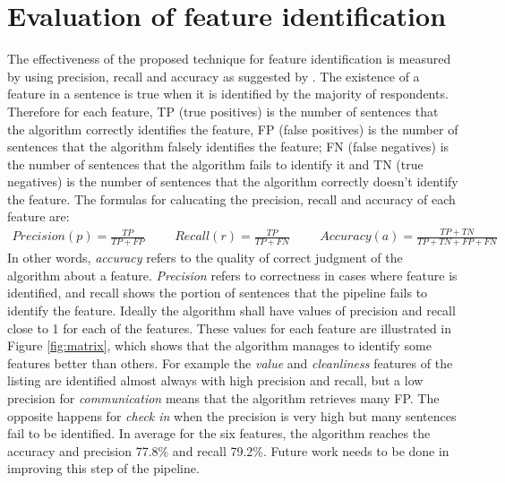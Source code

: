 \section{Evaluation of feature identification}
The effectiveness of the proposed technique for feature identification is measured by using precision, recall and accuracy as suggested by \cite{huang2006performance}.
The existence of a feature in a sentence is true when it is identified by the majority of respondents. Therefore for each feature, TP (true positives) is the number of sentences that the algorithm correctly identifies the feature, FP (false positives) is the number of sentences that the algorithm falsely identifies the feature; FN (false negatives) is the number of sentences that the algorithm fails to identify it and TN (true negatives) is the number of sentences that the algorithm correctly doesn't identify the feature. The formulas for calucating the precision, recall and accuracy of each feature are:
\begin{align}
Precision  (p) =\frac{TP}{TP+FP} \hspace{1cm}
Recall  (r) = \frac{TP}{TP + FN} \hspace{1cm}
Accuracy (a) = \frac{TP + TN}{TP+TN+FP+FN}
\end{align}
In other words, \textit{accuracy} refers to the quality of correct judgment of the algorithm about a feature.  \textit{Precision} refers to correctness in cases where feature is identified, and recall shows the portion of sentences that the pipeline fails to identify the feature. Ideally the algorithm shall have values of precision and recall close to 1 for each of the features.
These values for each feature are illustrated in Figure \ref{fig:matrix}, which shows that the algorithm manages to identify some features better than others. For example the \textit{value} and \textit{cleanliness} features of the listing are identified almost always with high precision and recall, but a low precision for \textit{communication} means that the algorithm retrieves many FP. The opposite happens for \textit{check in} when the precision is very high but many sentences fail to be identified. In average for the six features, the algorithm reaches the accuracy and precision 77.8\% and recall 79.2\%. Future work needs to be done in improving this step of the pipeline.
